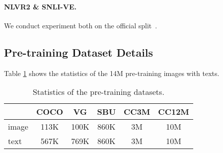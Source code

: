 \documentclass[11pt]{article}
\begin{document}
\paragraph{NLVR2 \& SNLI-VE.} We conduct experiment both on the official split~\cite{suhr2018corpus,snlive}.


\subsection{Pre-training Dataset Details}
Table \ref{table:pretraindata} shows the statistics of the 14M pre-training images with texts. 
\begin{table}[htbp]
\setlength\tabcolsep{4pt}
\centering
\small
\begin{tabular}{l|ccccc}
\toprule
  &  COCO & VG & SBU & CC3M & CC12M \\
\midrule
image & 113K & 100K & 860K & 3M & 10M  \\
text & 567K & 769K & 860K & 3M & 10M \\
\bottomrule
\end{tabular} 
\caption{Statistics of the pre-training datasets.}
\label{table:pretraindata}
\end{table}
 
\end{document}
